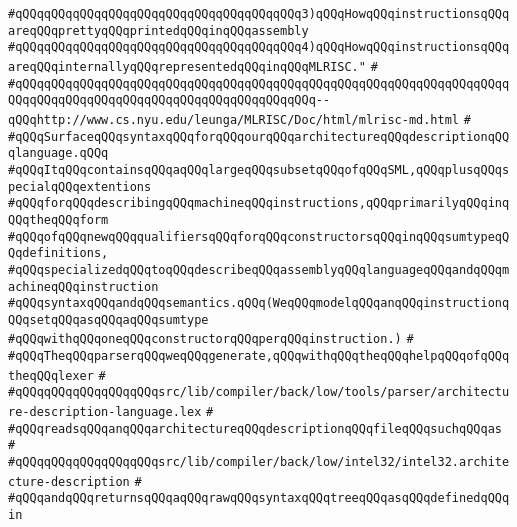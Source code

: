 \verb|#qQQqqQQqqQQqqQQqqQQqqQQqqQQqqQQqqQQqqQQq3)qQQqHowqQQqinstructionsqQQqareqQQqprettyqQQqprintedqQQqinqQQqassembly|\newline
\verb|#qQQqqQQqqQQqqQQqqQQqqQQqqQQqqQQqqQQqqQQq4)qQQqHowqQQqinstructionsqQQqareqQQqinternallyqQQqrepresentedqQQqinqQQqMLRISC."|\newline
\verb|#|\newline
\verb|#qQQqqQQqqQQqqQQqqQQqqQQqqQQqqQQqqQQqqQQqqQQqqQQqqQQqqQQqqQQqqQQqqQQqqQQqqQQqqQQqqQQqqQQqqQQqqQQqqQQqqQQqqQQqqQQq--qQQqhttp://www.cs.nyu.edu/leunga/MLRISC/Doc/html/mlrisc-md.html|\newline
\verb|#|\newline
\verb|#qQQqSurfaceqQQqsyntaxqQQqforqQQqourqQQqarchitectureqQQqdescriptionqQQqlanguage.qQQq|\newline
\verb|#qQQqItqQQqcontainsqQQqaqQQqlargeqQQqsubsetqQQqofqQQqSML,qQQqplusqQQqspecialqQQqextentions|\newline
\verb|#qQQqforqQQqdescribingqQQqmachineqQQqinstructions,qQQqprimarilyqQQqinqQQqtheqQQqform|\newline
\verb|#qQQqofqQQqnewqQQqqualifiersqQQqforqQQqconstructorsqQQqinqQQqsumtypeqQQqdefinitions,|\newline
\verb|#qQQqspecializedqQQqtoqQQqdescribeqQQqassemblyqQQqlanguageqQQqandqQQqmachineqQQqinstruction|\newline
\verb|#qQQqsyntaxqQQqandqQQqsemantics.qQQq(WeqQQqmodelqQQqanqQQqinstructionqQQqsetqQQqasqQQqaqQQqsumtype|\newline
\verb|#qQQqwithqQQqoneqQQqconstructorqQQqperqQQqinstruction.)|\newline
\verb|#|\newline
\verb|#qQQqTheqQQqparserqQQqweqQQqgenerate,qQQqwithqQQqtheqQQqhelpqQQqofqQQqtheqQQqlexer|\newline
\verb|#|\newline
\verb|#qQQqqQQqqQQqqQQqqQQqsrc/lib/compiler/back/low/tools/parser/architecture-description-language.lex|\newline
\verb|#|\newline
\verb|#qQQqreadsqQQqanqQQqarchitectureqQQqdescriptionqQQqfileqQQqsuchqQQqas|\newline
\verb|#|\newline
\verb|#qQQqqQQqqQQqqQQqqQQqsrc/lib/compiler/back/low/intel32/intel32.architecture-description|\newline
\verb|#|\newline
\verb|#qQQqandqQQqreturnsqQQqaqQQqrawqQQqsyntaxqQQqtreeqQQqasqQQqdefinedqQQqin|\newline
